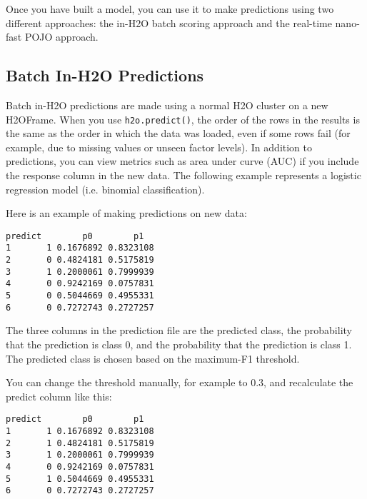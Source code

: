 Once you have built a model, you can use it to make predictions using two different approaches:  the in-H2O batch scoring approach and the real-time nano-fast POJO approach.

\subsection{Batch In-H2O Predictions}

Batch in-H2O predictions are made using a normal H2O cluster on a new H2OFrame.  When you use \texttt{h2o.predict()}, the order of the rows in the results is the same as the order in which the data was loaded, even if some rows fail (for example, due to missing values or unseen factor levels). 
In addition to predictions, you can view metrics such as area under curve (AUC) if you include the response column in the new data.  The following example represents a logistic regression model (i.e. binomial classification).

\waterExampleInR




\waterExampleInPython


\newpage
Here is an example of making predictions on new data:

\waterExampleInR


\waterExampleInPython

\begin{lstlisting}[style=output]
  predict        p0        p1
1       1 0.1676892 0.8323108
2       0 0.4824181 0.5175819
3       1 0.2000061 0.7999939
4       0 0.9242169 0.0757831
5       0 0.5044669 0.4955331
6       0 0.7272743 0.2727257
\end{lstlisting}


The three columns in the prediction file are the predicted class, the probability that the prediction is class 0,
and the probability that the prediction is class 1. The predicted class is chosen based on the maximum-F1 threshold.

You can change the threshold manually, for example to 0.3, and recalculate the predict column like this:



\begin{lstlisting}[style=output]
  predict        p0        p1
1       1 0.1676892 0.8323108
2       1 0.4824181 0.5175819
3       1 0.2000061 0.7999939
4       0 0.9242169 0.0757831
5       1 0.5044669 0.4955331
6       0 0.7272743 0.2727257
\end{lstlisting}

